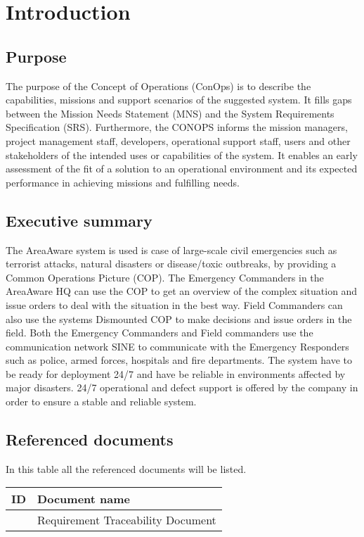 \chapter{Introduction}
\label{chp_intro}

\section{Purpose}
The purpose of the Concept of Operations (ConOps) is to describe the capabilities, missions and support scenarios of the suggested system. It fills gaps between the Mission Needs Statement (MNS) and the System Requirements Specification (SRS).
Furthermore, the CONOPS informs the mission managers, project management staff, developers, operational support staff, users and other stakeholders of the intended uses or capabilities of the system. It enables an early assessment of the fit of a solution to an operational environment and its expected performance in achieving missions and fulfilling needs.

\section{Executive summary}
The AreaAware system is used is case of large-scale civil emergencies such as terrorist attacks, natural disasters or disease/toxic outbreaks, by providing a Common Operations Picture (COP). The Emergency Commanders in the AreaAware HQ can use the COP to get an overview of the complex situation and issue orders to deal with the situation in the best way. Field Commanders can also use the systems Dismounted COP to make decisions and issue orders in the field. Both the Emergency Commanders and Field commanders use the communication network SINE to communicate with the Emergency Responders such as police, armed forces, hospitals and fire departments. The system have to be ready for deployment 24/7 and have be reliable in environments affected by major disasters. 24/7 operational and defect support is offered by the company in order to ensure a stable and reliable system.

\section{Referenced documents}
In this table all the referenced documents will be listed.

\begin{tabular}{b{6cm} b{7cm}}
	\textbf{ID} & \textbf{Document name} \\
	\hline
	\rtm & Requirement Traceability Document \\
\end{tabular}


